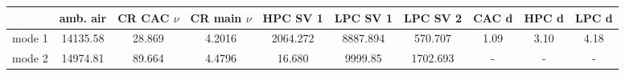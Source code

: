 \begin{minipage}{\linewidth}
    \center
    \footnotesize
    \begin{tabular}{lccccccccc}
        & amb. air & CR CAC $\nu$ & CR main $\nu$ & HPC SV 1 & LPC SV 1 & LPC SV 2 & CAC d & HPC d & LPC d \\ \hline
        mode 1 & 14135.58 & 28.869 & 4.2016 & 2064.272 & 8887.894 & 570.707 & 1.09 & 3.10 & 4.18\\
        mode 2 & 14974.81 & 89.664 & 4.4796 & 16.680 & 9999.85 & 1702.693 & - & - & - \\ \hline
    \end{tabular}
\end{minipage}
